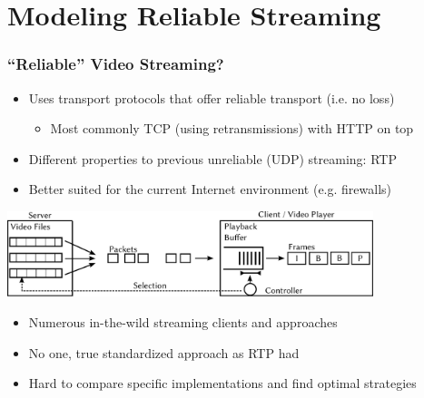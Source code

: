 \documentclass{beamer}
\begin{document}








\section{Modeling Reliable Streaming}

\begin{frame}
	\frametitle{``Reliable'' Video Streaming?}

	\begin{itemize}
		\item Uses transport protocols that offer reliable transport (i.e. no loss)
			\begin{itemize}
				\item Most commonly TCP (using retransmissions) with HTTP on top
			\end{itemize}
		\item Different properties to previous unreliable (UDP) streaming: RTP
		\item Better suited for the current Internet environment (e.g. firewalls)
	\end{itemize}

	\begin{center}
		\includegraphics[height=2.5cm]{../../chapters/03-streaming/images/playback-model.pdf}
	\end{center}

	\begin{itemize}
		\item Numerous in-the-wild streaming clients and approaches %
		\item No one, true standardized approach as RTP had
		\item Hard to compare specific implementations and find optimal strategies
	\end{itemize}

\end{frame}
\end{document}
